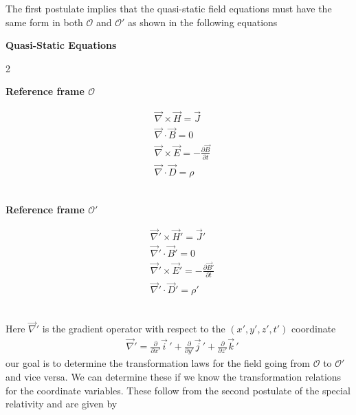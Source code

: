 \documentclass[12pt,a4paper,oneside]{book}
\begin{document}
\begin{onehalfspace}
The first postulate implies that the quasi-static field equations must have the same form in both  $\mathcal{O}$ and $\mathcal{O'}$ as shown in the following equations
\setlength{\columnseprule}{1pt}
\bigskip
\ \newline \centerline{\textbf{Quasi-Static Equations}}
\begin{multicols}{2}
	\centerline{\textbf{Reference frame $\mathcal{O}$}}	
	\begin{equation*}
		\begin{aligned}
			&\vec{\nabla}\times\vec{H} = \vec{J} \\[6pt]
			&\vec{\nabla}\cdot\vec{B} = 0 \\[6pt]
			&\vec{\nabla}\times\vec{E} = -\frac{\partial\vec{B}}{\partial t} \\[6pt]
			&\vec{\nabla}\cdot\vec{D} = \rho
		\end{aligned}
	\end{equation*} 
	\ \newline
	\columnbreak
	\ \newline
	\centerline{\textbf{Reference frame $\mathcal{O'}$}}	
\begin{equation}\label{maxwell_eq_moving_frame}
	\begin{aligned}
		&\vec{\nabla}'\times\vec{H}' = \vec{J}' \\[6pt]
		&\vec{\nabla}'\cdot\vec{B}' = 0 \\[6pt]
		&\vec{\nabla}'\times\vec{E}' = -\frac{\partial\vec{B}'}{\partial t} \\[6pt]
		&\vec{\nabla}'\cdot\vec{D}' = \rho'
	\end{aligned}
\end{equation} 
	\ \newline
\end{multicols}
Here $\vec{\nabla}'$ is the gradient operator with respect to the $(x',y',z',t')$ coordinate
\begin{equation*}
	\begin{aligned}
		&\vec{\nabla}'= \frac{\partial}{\partial x'}\vec{i}\,'+\frac{\partial}{\partial y'}\vec{j}\,'+\frac{\partial}{\partial z'}\vec{k}\,'
	\end{aligned}
\end{equation*} 
our goal is to determine the transformation laws for the field going from $\mathcal{O}$ to $\mathcal{O'}$ and vice versa. We can determine these if we know the transformation relations for the coordinate variables. These follow from the second postulate of the special relativity and are given by
 \begin{equation}\label{lorentz}

\end{equation}
\end{onehalfspace}
\end{document}
